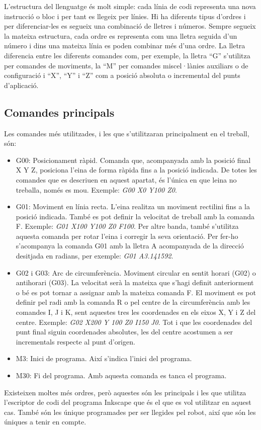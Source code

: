 L'estructura del llenguatge és molt simple: cada línia de codi representa una nova instrucció o bloc i per tant es llegeix per línies. Hi ha diferents tipus d'ordres i per diferenciar-les es segueix una combinació de lletres i números. Sempre segueix la mateixa estructura, cada ordre es representa com una lletra seguida d'un número i dins una mateixa línia es poden combinar més d'una ordre. La lletra diferencia entre les diferents comandes com, per exemple, la lletra “G” s'utilitza per comandes de moviments, la “M” per comandes miscel·lànies auxiliars o de configuració i “X”, “Y” i “Z” com a posició absoluta o incremental del punts d'aplicació.  

\subsection{Comandes principals}
Les comandes més utilitzades, i les que s'utilitzaran principalment en el treball, són:

\begin{itemize}
	\item	G00: Posicionament ràpid. Comanda que, acompanyada amb la posició final X Y Z, posiciona l'eina de forma ràpida fins a la posició indicada. De totes les comandes que es descriuen en aquest apartat, és l'única en que leina no treballa, només es mou. Exemple: \emph{G00 X0 Y100 Z0}.
	
	\item	G01: Moviment en línia recta. L'eina realitza un moviment rectilini fins a la posició indicada. També es pot definir la velocitat de treball amb la comanda F. Exemple: \emph{G01 X100 Y100 Z0 F100}. Per altre banda, també s'utilitza aquesta comanda per rotar l'eina i corregir la seva orientació. Per fer-ho s'acompanya la comanda G01 amb la lletra A acompanyada de la direcció desitjada en radians, per exemple: \emph{G01 A3.141592}.
	
	\item	G02 i G03: Arc de circumferència.  Moviment circular en sentit horari (G02) o antihorari (G03). La velocitat serà la mateixa que s'hagi definit anteriorment o bé es pot tornar a assignar amb la mateixa comanda F. El moviment es pot definir pel radi amb la comanda R o pel centre de la circumferència amb les comandes I, J i K, sent aquestes tres les coordenades en els eixos X, Y i Z del centre. Exemple: \emph{G02 X200 Y 100 Z0 I150 J0}. Tot i que les coordenades del punt final siguin coordenades absolutes, les del centre acostumen a ser incrementals respecte al punt d'origen.
	
	\item	M3: Inici de programa. Així s'indica l'inici del programa.
	
	\item	M30: Fi del programa. Amb aquesta comanda es tanca el programa. 
\end{itemize}
Existeixen moltes més ordres, però aquestes són les principals i les que utilitza l'escriptor de codi  del programa Inkscape que és el que es vol utilitzar en aquest cas. També són les únique programades per ser llegides pel robot, així que són les úniques a tenir en compte. 



